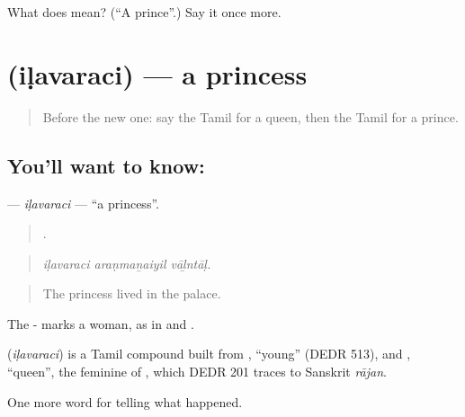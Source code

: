 \begin{tcolorbox}[breakable,colback=teal!4,colframe=teal!35!black,title={Before you move on}]
What does  mean? (\textquotedblleft{}A prince\textquotedblright{}.) Say it once more.
\end{tcolorbox}
\section[\texorpdfstring{\ta{இளவரசி} (iḷavaraci)}{இளவரசி (iḷavaraci)}]{ (iḷavaraci) — a princess}

\label{lesson:TA-C328-ilavaraci}



\begin{quote}
Before the new one: say the Tamil for a queen, then the Tamil for a prince.
\end{quote}

\subsection*{You'll want to know: }
\textbf{} — \emph{iḷavaraci} — \textquotedblleft{}a princess\textquotedblright{}.

\begin{quote}
  .
\end{quote}

\begin{quote}
\emph{iḷavaraci araṇmaṉaiyil vāḻntāḷ.}
\end{quote}

\begin{quote}
The princess lived in the palace.
\end{quote}

The - marks a woman, as in  and .

\begin{cousinweb}
\textbf{} (\emph{iḷavaraci}) is a Tamil compound built from , \textquotedblleft{}young\textquotedblright{} (DEDR 513), and , \textquotedblleft{}queen\textquotedblright{}, the feminine of , which DEDR 201 traces to Sanskrit \emph{rājan}.
\end{cousinweb}

\begin{grammarlens}[title={What you've built}]
One more word for telling what happened.
\end{grammarlens}

